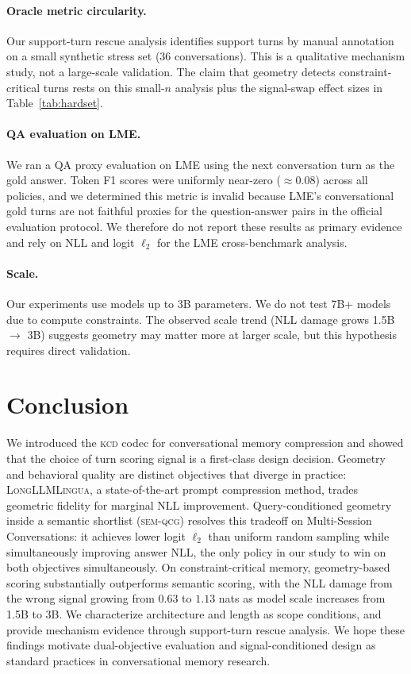 \documentclass[11pt]{article}
\newcommand{\kcd}{\textsc{kcd}}
\newcommand{\semqcg}{\textsc{sem-qcg}}
\begin{document}
\paragraph{Oracle metric circularity.}
Our support-turn rescue analysis identifies support turns by manual annotation
on a small synthetic stress set ($36$ conversations).
This is a qualitative mechanism study, not a large-scale validation.
The claim that geometry detects constraint-critical turns rests on
this small-$n$ analysis plus the signal-swap effect sizes in Table~\ref{tab:hardset}.

\paragraph{QA evaluation on LME.}
We ran a QA proxy evaluation on LME using the next conversation turn
as the gold answer.
Token F1 scores were uniformly near-zero ($\approx 0.08$) across all policies,
and we determined this metric is invalid because
LME's conversational gold turns are not faithful proxies for the
question-answer pairs in the official evaluation protocol.
We therefore do not report these results as primary evidence
and rely on NLL and logit $\ell_2$ for the LME cross-benchmark analysis.

\paragraph{Scale.}
Our experiments use models up to 3B parameters.
We do not test 7B+ models due to compute constraints.
The observed scale trend (NLL damage grows 1.5B $\to$ 3B) suggests
geometry may matter more at larger scale,
but this hypothesis requires direct validation.

\section{Conclusion}

We introduced the \kcd{} codec for conversational memory compression
and showed that the choice of turn scoring signal is a first-class
design decision.
Geometry and behavioral quality are distinct objectives that diverge
in practice:
\textsc{LongLLMLingua}, a state-of-the-art prompt compression method,
trades geometric fidelity for marginal NLL improvement.
Query-conditioned geometry inside a semantic shortlist (\semqcg{})
resolves this tradeoff on Multi-Session Conversations:
it achieves lower logit $\ell_2$ than uniform random sampling while
simultaneously improving answer NLL,
the only policy in our study to win on both objectives simultaneously.
On constraint-critical memory, geometry-based scoring substantially
outperforms semantic scoring,
with the NLL damage from the wrong signal growing from $0.63$ to $1.13$ nats
as model scale increases from 1.5B to 3B.
We characterize architecture and length as scope conditions,
and provide mechanism evidence through support-turn rescue analysis.
We hope these findings motivate dual-objective evaluation and
signal-conditioned design as standard practices in conversational memory research.
\end{document}

